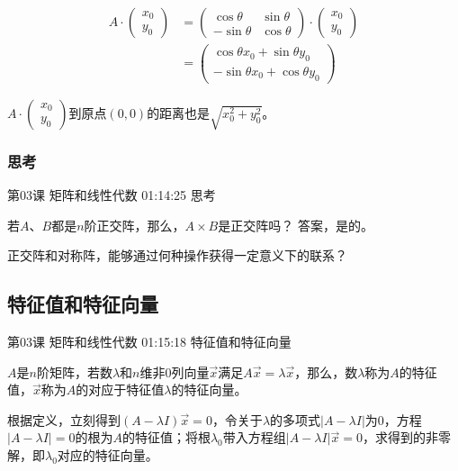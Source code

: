 \documentclass[UTF8]{ctexbook}
\begin{document}
\begin{equation}
\begin{aligned}
A \cdot \begin{pmatrix} x_{0} \\ y_{0} \end{pmatrix}
&= \begin{pmatrix} \cos \theta & \sin \theta \\ -\sin \theta & \cos \theta \end{pmatrix} \cdot
\begin{pmatrix} x_{0} \\ y_{0} \end{pmatrix} \\
&=
\begin{pmatrix}
\cos \theta x_{0} + \sin \theta y_{0} \\
-\sin \theta x_{0} + \cos \theta y_{0}
\end{pmatrix}
\end{aligned}
\end{equation}

$A \cdot \begin{pmatrix} x_{0} \\ y_{0} \end{pmatrix}$到原点$(0,0)$的距离也是$\sqrt{x_{0}^{2}+y_{0}^{2}}$。

\subsubsection{思考}

第03课 矩阵和线性代数 01:14:25 思考

若$A$、$B$都是$n$阶正交阵，那么，$A \times B$是正交阵吗？ 答案，是的。

正交阵和对称阵，能够通过何种操作获得一定意义下的联系？

\subsection{特征值和特征向量}

第03课 矩阵和线性代数 01:15:18 特征值和特征向量

$A$是$n$阶矩阵，若数$\lambda$和$n$维非$0$列向量$\vec{x}$满足$A\vec{x}=\lambda \vec{x}$，那么，数$\lambda$称为$A$的特征值，$\vec{x}$称为$A$的对应于特征值$\lambda$的特征向量。

根据定义，立刻得到$(A-\lambda I)\vec{x}=0$，令关于$\lambda$的多项式$|A-\lambda I|$为0，方程$|A-\lambda I|=0$的根为$A$的特征值；将根$\lambda_{0}$带入方程组$|A-\lambda I|\vec{x}=0$，求得到的非零解，即$\lambda_{0}$对应的特征向量。
\end{document}
